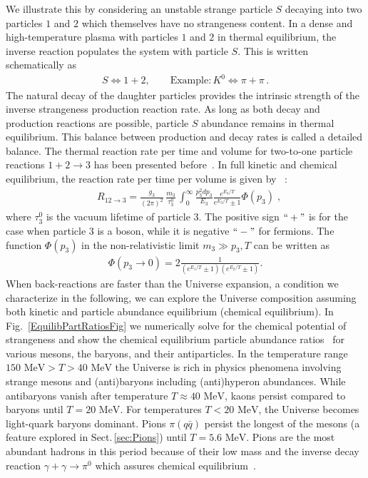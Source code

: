 \documentclass[universe,article,submit,moreauthors,pdftex,a4paper]{Definitions/mdpi}
\newcommand{\MeV}{\text{ MeV}}
\newcommand*{\rf}[1]{Fig.~{\ref{#1}}}
\newcommand*{\rsec}[1]{Sect.\,{\ref{#1}}}
\begin{document}
We illustrate this by considering an unstable strange particle $S$ decaying into two particles $1$ and $2$ which themselves have no strangeness content. In a dense and high-temperature plasma with particles $1$ and $2$ in thermal equilibrium, the inverse reaction populates the system with particle $S$. This is written schematically as
\begin{align}
 S\Longleftrightarrow1+2,\qquad \mathrm{Example}: K^0\Longleftrightarrow\pi+\pi\,.
\end{align}
The natural decay of the daughter particles provides the intrinsic strength of the inverse strangeness production reaction rate. As long as both decay and production reactions are possible, particle $S$ abundance remains in thermal equilibrium. This balance between production and decay rates is called a detailed balance. The thermal reaction rate per time and volume for two-to-one particle reactions $1+2\rightarrow 3$ has been presented before~\cite{Kuznetsova:2008jt,Kuznetsova:2010pi}. In full kinetic and chemical equilibrium, the reaction rate per time per volume is given by~\cite{Kuznetsova:2010pi} :
\begin{align}
&R_{12\to 3}=\frac{g_3}{(2\pi)^2}\,\frac{m_3}{\tau^0_3}\,\int^\infty_0\frac{p^2_3dp_3}{E_3}\frac{e^{E_3/T}}{e^{E_3/T}\pm1}\Phi(p_3)\;,
\end{align}
where $\tau^0_3$ is the vacuum lifetime of particle $3$. The positive sign $``+"$ is for the case when particle $3$ is a boson, while it is negative $``-"$ for fermions. The function $\Phi(p_3)$ in the non-relativistic limit $m_3\gg p_3,T$ can be written as 
\begin{align}\label{photonfusion}
\Phi(p_3\to0)=2\frac{1}{(e^{E_1/T}\pm1)(e^{E_2/T}\pm1)}.
\end{align}
When back-reactions are faster than the Universe expansion, a condition we characterize in the following, we can explore the Universe composition assuming both kinetic and particle abundance equilibrium (chemical equilibrium). In \rf{EquilibPartRatiosFig} we numerically solve for the chemical potential of strangeness and show the chemical equilibrium particle abundance ratios~\cite{Yang:2021bko} for various mesons, the baryons, and their antiparticles. In the temperature range $150\MeV>T>40\MeV$ the Universe is rich in physics phenomena involving strange mesons and (anti)baryons including (anti)hyperon abundances. While antibaryons vanish after temperature $T\approx40\MeV$, kaons persist compared to baryons until $T=20\MeV$. For temperatures $T<20\MeV$, the Universe becomes light-quark baryons  dominant. Pions $\pi(q\bar q)$ persist the longest of the mesons (a feature explored in \rsec{sec:Pions}) until $T=5.6\MeV$. Pions are the most abundant hadrons in this period because of their low mass and the inverse decay reaction $\gamma+\gamma\rightarrow\pi^0$ which assures chemical equilibrium~\cite{Kuznetsova:2008jt}.
\end{document}
